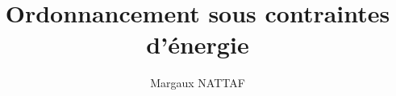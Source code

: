 \documentclass[11pt,a4paper]{book}
\title{\textbf{\large Ordonnancement sous contraintes d'énergie}}
\author{Margaux NATTAF}
\begin{document}
\makeflyleaf
\doparttoc
\tableofcontents
\listoffigures
\listoftables



% 

\printindex



\end{document}
